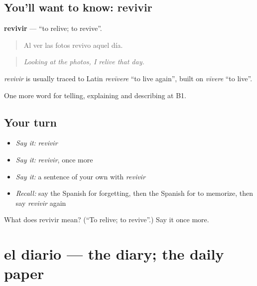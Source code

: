 \subsection*{You'll want to know: revivir}
\textbf{revivir} — \textquotedblleft{}to relive; to revive\textquotedblright{}.

\begin{quote}
Al ver las fotos revivo aquel día.
\end{quote}

\begin{quote}
\emph{Looking at the photos, I relive that day.}
\end{quote}

\begin{cousinweb}
\emph{revivir} is usually traced to Latin \emph{revīvere} \textquotedblleft{}to live again\textquotedblright{}, built on \emph{vīvere} \textquotedblleft{}to live\textquotedblright{}.
\end{cousinweb}

\begin{grammarlens}[title={What you've built}]
One more word for telling, explaining and describing at B1.
\end{grammarlens}

\subsection*{Your turn}
\begin{itemize}
\raggedright
  \item \emph{Say it:} \emph{revivir}
  \item \emph{Say it:} \emph{revivir}, once more
  \item \emph{Say it:} a sentence of your own with \emph{revivir}
  \item \emph{Recall:} say the Spanish for forgetting, then the Spanish for to memorize, then say \emph{revivir} again
\end{itemize}

\begin{tcolorbox}[breakable,colback=teal!4,colframe=teal!35!black,title={Before you move on}]
What does revivir mean? (\textquotedblleft{}To relive; to revive\textquotedblright{}.) Say it once more.
\end{tcolorbox}
\section[el diario]{el diario — the diary; the daily paper}


